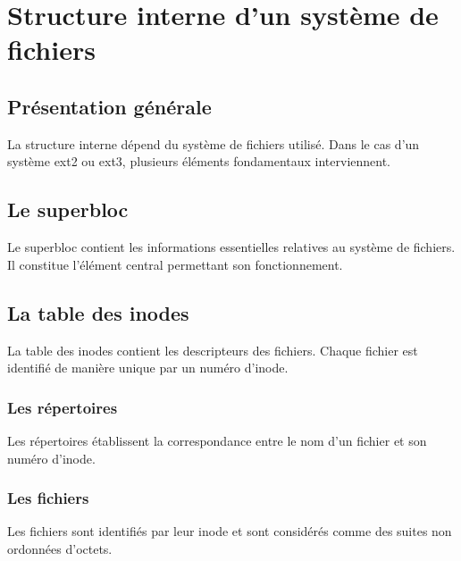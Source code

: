 \chapter{Structure interne d'un système de fichiers}
	\section{Présentation générale}
	La structure interne dépend du système de fichiers utilisé. Dans le cas d'un système ext2 ou ext3, plusieurs éléments fondamentaux interviennent.

	\section{Le superbloc}
Le superbloc contient les informations essentielles relatives au système de fichiers. Il constitue l'élément central permettant son fonctionnement.

	\section{La table des inodes}
La table des inodes contient les descripteurs des fichiers. Chaque fichier est identifié de manière unique par un numéro d'inode.

	\subsection{Les répertoires}
Les répertoires établissent la correspondance entre le nom d'un fichier et son numéro d'inode.

	\subsection{Les fichiers}
Les fichiers sont identifiés par leur inode et sont considérés comme des suites non ordonnées d'octets.
